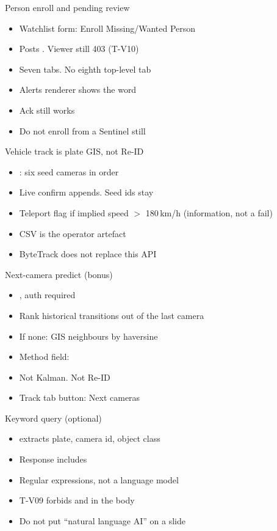 \documentclass[aspectratio=169,11pt]{beamer}
\begin{document}
\begin{frame}{Person enroll and pending review}
\begin{itemize}\itemsep0.55em
\item Watchlist form: Enroll Missing/Wanted Person
\item Posts . Viewer still 403 (T-V10)
\item Seven tabs. No eighth top-level tab
\item Alerts renderer shows the word 
\item Ack still works
\item Do not enroll from a Sentinel still
\end{itemize}
\end{frame}

\begin{frame}{Vehicle track is plate GIS, not Re-ID}
\begin{itemize}\itemsep0.55em
\item {}: six seed cameras in order
\item Live confirm appends. Seed ids stay
\item Teleport flag if implied speed $>$ 180\,km/h (information, not a fail)
\item CSV is the operator artefact
\item ByteTrack does not replace this API
\end{itemize}
\end{frame}

\begin{frame}{Next-camera predict (bonus)}
\begin{itemize}\itemsep0.55em
\item {}, auth required
\item Rank historical transitions out of the last camera
\item If none: GIS neighbours by haversine
\item Method field: 
\item Not Kalman. Not Re-ID
\item Track tab button: Next cameras
\end{itemize}
\end{frame}

\begin{frame}{Keyword query (optional)}
\begin{itemize}\itemsep0.55em
\item {} extracts plate, camera id, object class
\item Response includes 
\item Regular expressions, not a language model
\item T-V09 forbids  and  in the body
\item Do not put ``natural language AI'' on a slide
\end{itemize}
\end{frame}
\end{document}
